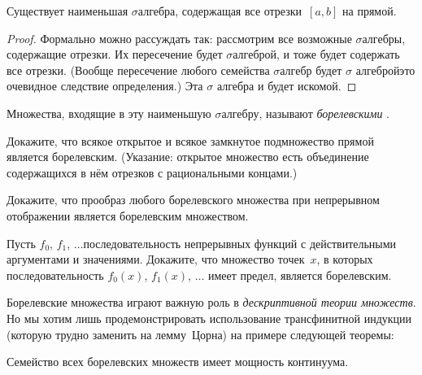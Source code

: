 \begin{theorem}
        \label{borel-sets}
Существует наименьшая $\sigma$\д алгебра, содержащая
все отрезки~$[a,b]$ на прямой.
\end{theorem}

\begin{proof}
Формально можно рассуждать так: рассмотрим все возможные
$\sigma$\д алгебры, содержащие отрезки. Их пересечение будет
$\sigma$\д алгеброй, и тоже будет содержать все отрезки. (Вообще
пересечение любого семейства $\sigma$\д алгебр будет $\sigma$\д
алгеброй\т это очевидное следствие определения.) Эта $\sigma$\д
алгебра и будет искомой.
\end{proof}

Множества, входящие в эту наименьшую $\sigma$\д алгебру,
называют \emph{борелевскими}%
.

\begin{problem}
Докажите, что всякое открытое и всякое замкнутое подмножество
прямой является борелевским. (Указание: открытое множество
есть объединение содержащихся в нём отрезков с рациональными
концами.)
\end{problem}

\begin{problem}
Докажите, что прообраз любого
борелевского множества при непрерывном
отображении является борелевским множеством.
\end{problem}

\begin{problem}
Пусть $f_0$, $f_1$, $\dots$\т последовательность непрерывных функций
с действительными аргументами и значениями. Докажите, что множество
точек~$x$, в которых последовательность $f_0(x)$, $f_1(x)$, $\dots$
имеет предел, является борелевским.
\end{problem}

\problskip
Борелевские множества играют важную роль в \emph{дескриптивной
теории множеств}. Но мы
хотим лишь продемонстрировать использование трансфинитной
индукции (которую трудно заменить на лемму~Цорна) на примере
следующей теоремы:

\begin{theorem}
        \label{borel-sets-continuum}%
Семейство всех борелевских множеств%
 имеет мощность континуума.
\end{theorem}

